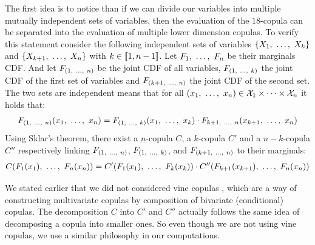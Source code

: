 The first idea is to notice than if we can divide our variables into multiple mutually independent sets of variables, then the evaluation of the $18$-copula can be separated into the evaluation of multiple lower dimension copulas. To verify this statement consider the following independent sets of variables $\{X_1 , ~\dots, ~ X_k\}$ and $\{X_{k+1} , ~\dots, ~ X_n\}$ with $k\in[\![1,n-1]\!]$. Let $F_1 , ~\dots, ~  F_n$ be their marginals CDF. And let $F_{(1 , ~\dots, ~ n)}$ be the joint CDF of all variables, $F_{(1 , ~\dots, ~ k)}$ the joint CDF of the first set of variables and $F_{(k+1 , ~\dots, ~ n)}$ the joint CDF of the second set. The two sets are independent means that for all $(x_1 , ~\dots, ~ x_n)\in\mathcal{X}_1\times\dots\times\mathcal{X}_n$ it holds that:
\begin{align*}
    F_{(1 , ~\dots, ~ n)}(x_1 , ~\dots, ~ x_n) = F_{(1 , ~\dots, ~ k)}(x_1 , ~\dots, ~ x_k)\cdot F_{k+1 , ~\dots, ~ n}(x_{k+1} , ~\dots, ~ x_n)
\end{align*}
Using Sklar's theorem, there exist a $n$-copula $C$, a $k$-copula $C'$ and a $n-k$-copula $C''$ respectively linking $F_{(1 , ~\dots, ~ n)}$, $F_{(1 , ~\dots, ~ k)}$, and $F_{(k+1 , ~\dots, ~ n)}$ to their marginals:
\begin{align}
    C(F_1(x_1) , ~\dots, ~ F_n(x_n)) = C'(F_1(x_1) , ~\dots, ~ F_k(x_k))\cdot C''(F_{k+1}(x_{k+1}) , ~\dots, ~ F_n(x_n))\label{eq:copula_factorizing}
\end{align}

\begin{remark}
    We stated earlier that we did not considered vine copulas \cite{czado_vine_2022}, which are a way of constructing multivariate copulas by composition of bivariate (conditional) copulas. The decomposition $C$ into $C'$ and $C''$ actually follows the same idea of decomposing a copula into smaller ones. So even though we are not using vine copulas, we use a similar philosophy in our computations.
\end{remark}

